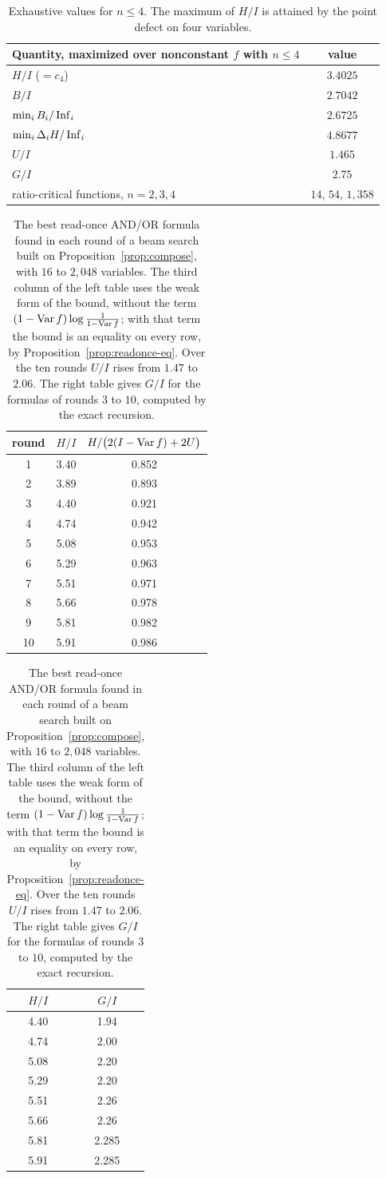 \begin{table}[ht]
\centering\small
\begin{tabular}{lc}
\toprule
Quantity, maximized over nonconstant $f$ with $n\le4$ & value\\
\midrule
$H/I$ ($=c_4$) & $3.4025$\\
$B/I$ & $2.7042$\\
$\min_iB_i/\operatorname{Inf}_i$ & $2.6725$\\
$\min_i\Delta_iH/\operatorname{Inf}_i$ & $4.8677$\\
$U/I$ & $1.465$\\
$G/I$ & $2.75$\\
\midrule
ratio-critical functions, $n=2,3,4$ & $14$, $54$, $1{,}358$\\
\bottomrule
\end{tabular}
\caption{Exhaustive values for $n\le4$. The maximum of $H/I$ is attained by the point defect on four variables.}
\label{tab:fei-exhaustive}
\end{table}

\begin{table}[ht]
\centering\small
\begin{tabular}{ccc}
\toprule
round & $H/I$ & $H/\bigl(2(I-\operatorname{Var} f)+2U\bigr)$ \\
\midrule
1 & 3.40 & 0.852\\
2 & 3.89 & 0.893\\
3 & 4.40 & 0.921\\
4 & 4.74 & 0.942\\
5 & 5.08 & 0.953\\
6 & 5.29 & 0.963\\
7 & 5.51 & 0.971\\
8 & 5.66 & 0.978\\
9 & 5.81 & 0.982\\
10 & 5.91 & 0.986\\
\bottomrule
\end{tabular}
\qquad
\begin{tabular}{cc}
\toprule
$H/I$ & $G/I$\\
\midrule
4.40 & 1.94\\
4.74 & 2.00\\
5.08 & 2.20\\
5.29 & 2.20\\
5.51 & 2.26\\
5.66 & 2.26\\
5.81 & 2.285\\
5.91 & 2.285\\
\bottomrule
\end{tabular}
\caption{The best read-once AND/OR formula found in each round of a beam search built on Proposition~\ref{prop:compose}, with $16$ to $2{,}048$ variables. The third column of the left table uses the weak form of the bound, without the term $(1-\operatorname{Var} f)\log\frac1{1-\operatorname{Var} f}$; with that term the bound is an equality on every row, by Proposition~\ref{prop:readonce-eq}. Over the ten rounds $U/I$ rises from $1.47$ to $2.06$. The right table gives $G/I$ for the formulas of rounds $3$ to $10$, computed by the exact recursion.}
\label{tab:fei-readonce}
\end{table}

